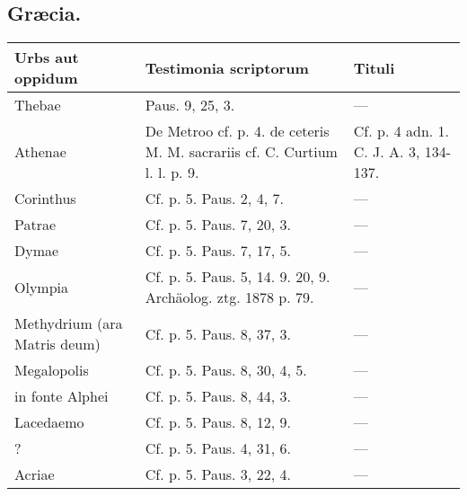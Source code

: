 \documentclass[a4paper, 11pt, oneside, polutonikogreek, german]{article}
\begin{document}
\subsection{Græcia.}
\begin{table}[H]
    \Fontauri
    \footnotesize
    \centering
    \begin{tabular}{|p{30mm}|p{30mm}|p{60mm}|}
    \hline
        Urbs aut oppidum & Testimonia scriptorum & Tituli \\ \hline
        Thebae & Paus. 9, 25, 3. & --- \\ \hline
        Athenae & De Metroo cf. p. 4. de ceteris M. M. sacrariis cf. C. Curtium l. l. p. 9. & Cf. p. 4 adn. 1. C. J. A. 3, 134-137. \\ \hline
        Corinthus & Cf. p. 5. Paus. 2, 4, 7. & --- \\ \hline
        Patrae & Cf. p. 5. Paus. 7, 20, 3. & --- \\ \hline
        Dymae & Cf. p. 5. Paus. 7, 17, 5. & --- \\ \hline
        Olympia & Cf. p. 5. Paus. 5, 14. 9. 20, 9. Archäolog. ztg. 1878 p. 79. & --- \\ \hline
        Methydrium (ara Matris deum) & Cf. p. 5. Paus. 8, 37, 3. & --- \\ \hline
        Megalopolis & Cf. p. 5. Paus. 8, 30, 4, 5. & --- \\ \hline
        in fonte Alphei & Cf. p. 5. Paus. 8, 44, 3. & --- \\ \hline
        Lacedaemo & Cf. p. 5. Paus. 8, 12, 9. & --- \\ \hline
        [Messene] ? & Cf. p. 5. Paus. 4, 31, 6. & --- \\ \hline
        Acriae & Cf. p. 5. Paus. 3, 22, 4. & --- \\ \hline
    \end{tabular}
\end{table}
\end{document}
